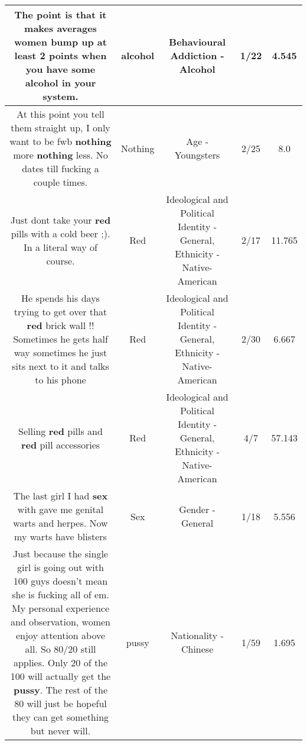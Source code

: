 \documentclass[11pt]{article}
\newlength\mylength
\begin{document}
\begin{center}
\begin{longtable}{|C{.65\mylength}|C{.30\mylength}|C{.12\mylength}|C{.12\mylength}|C{.12\mylength}|}
  \small The point is that it makes averages women bump up at least 2 points when you have some \textbf{alcohol} in your system.\normalsize   & alcohol & Behavioural Addiction - Alcohol & 1/22 & 4.545 \\  \hline
  \small At this point you tell them straight up, I only want to be fwb \textbf{nothing} more \textbf{nothing} less. No dates till fucking a couple times.\normalsize   & Nothing & Age - Youngsters & 2/25 & 8.0 \\  \hline
  \small Just dont take your \textbf{r\textbf{ed}} pills with a cold beer ;). In a literal way of course.\normalsize   & Red &  Ideological and Political Identity - General, Ethnicity - Native-American & 2/17 & 11.765 \\  \hline
  \small He spends his days trying to get over that \textbf{r\textbf{ed}} brick wall !! Sometimes he gets half way sometimes he just sits next to it and talks to his phone\normalsize   & Red &  Ideological and Political Identity - General, Ethnicity - Native-American & 2/30 & 6.667 \\  \hline
  \small Selling \textbf{r\textbf{ed}} pills and \textbf{r\textbf{ed}} pill accessories\normalsize   & Red &  Ideological and Political Identity - General, Ethnicity - Native-American & 4/7 & 57.143 \\  \hline
  \small The last girl I had \textbf{sex} with gave me genital warts and herpes. Now my warts have blisters\normalsize   & Sex & Gender - General & 1/18 & 5.556 \\  \hline
  \small Just because the single girl is going out with 100 guys doesn't mean she is fucking all of em.  My personal experience and observation, women enjoy attention above all.  So 80/20 still applies.  Only 20 of the 100 will actually get the \textbf{pussy}.  The rest of the 80 will just be hopeful they can get something but never will.\normalsize   & pussy & Nationality - Chinese & 1/59 & 1.695 \\  \hline

\end{longtable}
\end{center}
\end{document}
